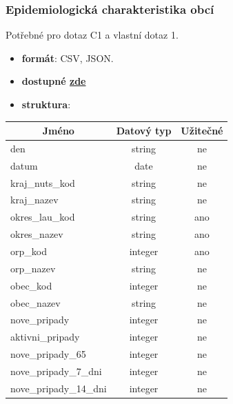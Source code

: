 \documentclass[12pt]{article}
\begin{document}
\subsubsection*{Epidemiologická charakteristika obcí}        
Potřebné pro dotaz C1 a vlastní dotaz 1.
\begin{itemize}
    \item \textbf{formát}: CSV, JSON.
    \item \textbf{dostupné  \href{https://onemocneni-aktualne.mzcr.cz/api/v2/covid-19/obce.csv}{zde}}
    \item \textbf{struktura}:
\end{itemize}
        \begin{center}
            \begin{tabular}{ |l|c|c| } 
                \hline
                \multicolumn{1}{|c|}{Jméno} & Datový typ & Užitečné \\
                \hline
                \hline
                den & string & ne \\ 
                \hline
                datum & date & ne \\ 
                \hline
                kraj\_nuts\_kod & string & ne \\ 
                \hline
                kraj\_nazev & string & ne \\ 
                \hline
                okres\_lau\_kod & string & ano \\ 
                \hline
                okres\_nazev & string & ano \\ 
                \hline
                orp\_kod & integer & ano \\ 
                \hline
                orp\_nazev & string & ne \\ 
                \hline
                obec\_kod & integer & ne \\ 
                \hline
                obec\_nazev & string & ne \\ 
                \hline
                nove\_pripady & integer & ne \\ 
                \hline
                aktivni\_pripady & integer & ne \\ 
                \hline
                nove\_pripady\_65 & integer & ne \\ 
                \hline
                nove\_pripady\_7\_dni & integer & ne \\ 
                \hline
                nove\_pripady\_14\_dni & integer & ne \\ 
                \hline
            \end{tabular}
        \end{center} 
\end{document}
